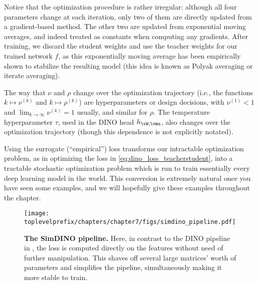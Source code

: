 \documentclass[\toplevelprefix/book-main.tex]{subfiles}
\begin{document}
Notice that the optimization procedure is rather irregular: although all four parameters change at each iteration, only two of them are directly updated from a gradient-based method. The other two are updated from exponential moving averages, and indeed treated as constants when computing any gradients. After training, we discard the student weights and use the teacher weights for our trained network \(f\), as this exponentially moving average has been empirically shown to stabilize the resulting model (this idea is known as Polyak averaging or iterate averaging). 

The way that \(\nu\) and \(\rho\) change over the optimization trajectory (i.e., the functions \(k \mapsto \nu^{(k)}\) and \(k \mapsto \rho^{(k)}\)) are hyperparameters or design decisions, with \(\nu^{(1)} < 1\) and \(\lim_{k \to \infty}\nu^{(k)} = 1\) usually, and similar for \(\rho\). The temperature hyperparameter \(\tau\), used in the DINO head \(h_{\vW, \vmu}\), also changes over the optimization trajectory (though this dependence is not explicitly notated).

Using the surrogate (``empirical'') loss transforms our intractable optimization problem, as in optimizing the loss in \eqref{eq:dino_loss_teacherstudent}, into a tractable stochastic optimization problem which is run to train essentially every deep learning model in the world. This conversion is extremely natural once you have seen some examples, and we will hopefully give these examples throughout the chapter. 

\begin{figure}
    \centering 
    \texttt{[image: \\toplevelprefix/chapters/chapter7/figs/simdino\_pipeline.pdf]}
    \caption{\small\textbf{The SimDINO pipeline.} Here, in contrast to the DINO pipeline in , the loss is computed directly on the features without need of further manipulation. This shaves off several large matrices' worth of parameters and simplifies the pipeline, simultaneously making it more stable to train.}\label{fig:simdino_pipeline}
\end{figure}
\end{document}
